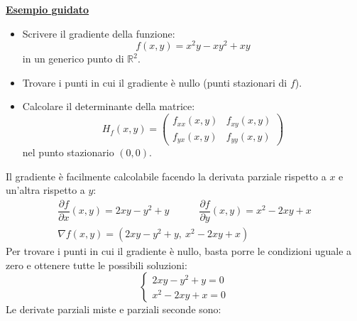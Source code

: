 \documentclass[a4paper]{article}
\newcommand{\example}[1]{\textcolor{Green4}{\textbf{#1}}}
\begin{document}
	\begin{flushleft}
		\example{\underline{Esempio guidato}}
	\end{flushleft}
	\begin{itemize}
		\item Scrivere il gradiente della funzione:
		\begin{equation*}
			f\left(x,y\right) = x^{2}y - xy^{2} + xy
		\end{equation*}
		in un generico punto di $\mathbb{R}^{2}$.

		\item Trovare i punti in cui il gradiente è nullo (punti stazionari di $f$).

		\item Calcolare il determinante della matrice:
		\begin{equation}
			H_{f}\left(x,y\right) = 
			\begin{pmatrix}
				f_{xx}\left(x,y\right) & f_{xy}\left(x,y\right) \\
				f_{yx}\left(x,y\right) & f_{yy}\left(x,y\right)
			\end{pmatrix}
		\end{equation}
		nel punto stazionario $\left(0,0\right)$.
	\end{itemize}
	Il gradiente è facilmente calcolabile facendo la derivata parziale rispetto a $x$ e un'altra rispetto a $y$:
	\begin{gather*}
		\dfrac{\partial f}{\partial x} \left(x,y\right) = 2xy - y^{2} + y 
		\hspace{3em}
		\dfrac{\partial f}{\partial y} \left(x,y\right) = x^{2} - 2xy + x \\
		\nabla f \left(x,y\right) = \left(2xy - y^{2} + y, \: x^{2} - 2xy + x\right)
	\end{gather*}
	Per trovare i punti in cui il gradiente è nullo, basta porre le condizioni uguale a zero e ottenere tutte le possibili soluzioni:
	\begin{equation*}
		\begin{cases}
			2xy - y^{2} + y = 0 \\
			x^{2} - 2xy + x = 0
		\end{cases}
	\end{equation*}
	Le derivate parziali miste e parziali seconde sono:
\end{document}
